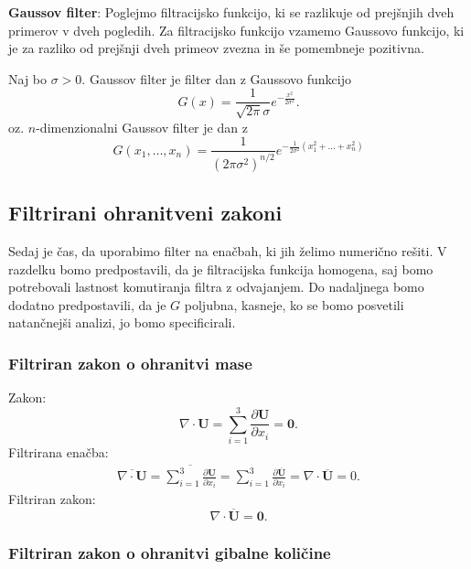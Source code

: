 \documentclass[mat2, tisk]{fmfdelo}
\newcommand{\bd}{\textbf}
\begin{document}
\noindent
\textbf{Gaussov filter}:
Poglejmo filtracijsko funkcijo, ki se razlikuje od prejšnjih dveh primerov v dveh pogledih.
Za filtracijsko funkcijo vzamemo Gaussovo funkcijo, ki je za razliko od prejšnji dveh 
primeov zvezna in še pomembneje pozitivna.
\begin{definicija}
Naj bo $\sigma > 0$. Gaussov filter je filter dan z Gaussovo funkcijo 
\begin{equation}
G(x) = \frac{1}{\sqrt{2\pi}\sigma} e^{-\frac{x^2}{2\sigma^2}}.
\end{equation}
oz. $n$-dimenzionalni Gaussov filter je dan z 
\begin{equation}
G(x_1, \dots, x_n) = \frac{1}{(2\pi \sigma^2)^{n/2}} e^{-\frac{1}{2\sigma^2}(x_1^2 + \dots + x_n^2)}
\end{equation}
\end{definicija}


\subsection{Filtrirani ohranitveni zakoni}

Sedaj je čas, da uporabimo filter na enačbah, ki jih želimo numerično rešiti. V 
razdelku bomo predpostavili, da je filtracijska funkcija homogena, saj bomo potrebovali 
lastnost komutiranja filtra z odvajanjem. Do nadaljnega bomo dodatno predpostavili, 
da je $G$ poljubna, kasneje, ko se bomo posvetili natančnejši analizi, jo bomo specificirali.

\subsubsection{Filtriran zakon o ohranitvi mase}

Zakon:
$$
\nabla\cdot \bd{U} = \sum_{i=1}^3 \frac{\partial \bd{U}}{\partial x_i} = \bd{0}.
$$
\noindent
Filtrirana enačba:
\begin{align*}
\overline{\nabla\cdot \bd{U}}= \overline{\sum_{i=1}^3 \frac{\partial \bd{U}}{\partial x_i}} = 
\sum_{i=1}^3 \frac{\partial \overline{\bd{U}}}{\partial x_i} = \nabla\cdot \overline{\bd{U}} = 0.
\end{align*}
\noindent
Filtriran zakon:
\begin{equation}
\nabla\cdot\overline{\bd{U}} = \bd{0}.
\end{equation}

\subsubsection{Filtriran zakon o ohranitvi gibalne količine}
\end{document}
